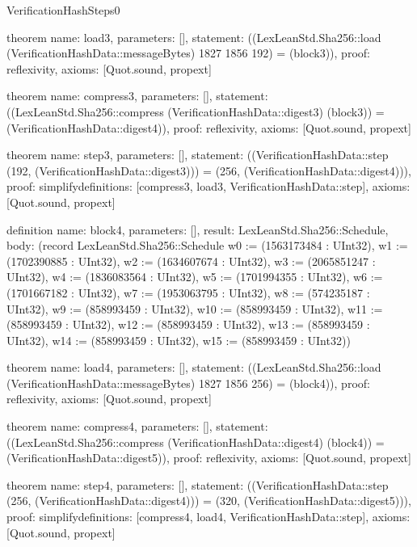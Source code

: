 \begin{lexlean}{VerificationHashSteps0}
\begin{semanticmodule}
theorem{
  name: load3,
  parameters: [],
  statement: ((LexLeanStd.Sha256::load (VerificationHashData::messageBytes) 1827 1856 192) = (block3)),
  proof: reflexivity{},
  axioms: [Quot.sound, propext]
}

theorem{
  name: compress3,
  parameters: [],
  statement: ((LexLeanStd.Sha256::compress (VerificationHashData::digest3) (block3)) = (VerificationHashData::digest4)),
  proof: reflexivity{},
  axioms: [Quot.sound, propext]
}

theorem{
  name: step3,
  parameters: [],
  statement: ((VerificationHashData::step (192, (VerificationHashData::digest3))) = (256, (VerificationHashData::digest4))),
  proof: simplify{definitions: [compress3, load3, VerificationHashData::step]},
  axioms: [Quot.sound, propext]
}

definition{
  name: block4,
  parameters: [],
  result: LexLeanStd.Sha256::Schedule,
  body: (record LexLeanStd.Sha256::Schedule {w0 := (1563173484 : UInt32), w1 := (1702390885 : UInt32), w2 := (1634607674 : UInt32), w3 := (2065851247 : UInt32), w4 := (1836083564 : UInt32), w5 := (1701994355 : UInt32), w6 := (1701667182 : UInt32), w7 := (1953063795 : UInt32), w8 := (574235187 : UInt32), w9 := (858993459 : UInt32), w10 := (858993459 : UInt32), w11 := (858993459 : UInt32), w12 := (858993459 : UInt32), w13 := (858993459 : UInt32), w14 := (858993459 : UInt32), w15 := (858993459 : UInt32)})
}

theorem{
  name: load4,
  parameters: [],
  statement: ((LexLeanStd.Sha256::load (VerificationHashData::messageBytes) 1827 1856 256) = (block4)),
  proof: reflexivity{},
  axioms: [Quot.sound, propext]
}

theorem{
  name: compress4,
  parameters: [],
  statement: ((LexLeanStd.Sha256::compress (VerificationHashData::digest4) (block4)) = (VerificationHashData::digest5)),
  proof: reflexivity{},
  axioms: [Quot.sound, propext]
}

theorem{
  name: step4,
  parameters: [],
  statement: ((VerificationHashData::step (256, (VerificationHashData::digest4))) = (320, (VerificationHashData::digest5))),
  proof: simplify{definitions: [compress4, load4, VerificationHashData::step]},
  axioms: [Quot.sound, propext]
}

\end{semanticmodule}
\end{lexlean}
